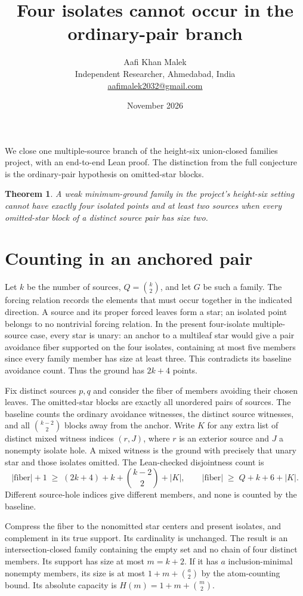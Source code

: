 \documentclass[11pt,letterpaper]{article}
\title{Four isolates cannot occur in the ordinary-pair branch}
\author{Aafi Khan Malek\\\small Independent Researcher, Ahmedabad, India\\
\small\href{mailto:aafimalek2032@gmail.com}{aafimalek2032@gmail.com}}
\date{November 2026}
\newtheorem{theorem}{Theorem}
\begin{document}
\maketitle
We close one multiple-source branch of the height-six
union-closed families project, with an end-to-end Lean proof.
The distinction from the full conjecture is the ordinary-pair
hypothesis on omitted-star blocks.

\begin{theorem}
A weak minimum-ground family in the project's height-six
setting cannot have exactly four isolated points and at least
two sources when every omitted-star block of a distinct
source pair has size two.
\end{theorem}

\section*{Counting in an anchored pair}
Let \(k\) be the number of sources, \(Q=\binom k2\), and let
\(G\) be such a family. The forcing relation records the
elements that must occur together in the indicated direction.
A source and its proper forced leaves form a star; an isolated
point belongs to no nontrivial forcing relation. In the
present four-isolate multiple-source case, every star is
unary: an anchor to a multileaf star would give a pair
avoidance fiber supported on the four isolates, containing
at most five members since every family member has size
at least three. This contradicts its baseline avoidance
count. Thus the ground has \(2k+4\) points.

Fix distinct sources \(p,q\) and consider the fiber of members
avoiding their chosen leaves. The omitted-star blocks are
exactly all unordered pairs of sources. The baseline counts
the ordinary avoidance witnesses, the distinct source
witnesses, and all \(\binom{k-2}{2}\) blocks away from the
anchor. Write \(K\) for any extra list of distinct mixed
witness indices \((r,J)\), where \(r\) is an exterior source and
\(J\) a nonempty isolate hole. A mixed witness is the ground
with precisely that unary star and those isolates omitted.
The Lean-checked disjointness count is
\[
 |\text{fiber}|+1\;\ge\; (2k+4)+k+\binom{k-2}{2}+|K|,
 \qquad
 |\text{fiber}|\;\ge\;Q+k+6+|K|.
\]
Different source-hole indices give different members, and none
is counted by the baseline.

Compress the fiber to the nonomitted star centers and present
isolates, and complement in its true support. Its cardinality
is unchanged. The result is an intersection-closed family
containing the empty set and no chain of four distinct members.
Its support has size at most \(m=k+2\). If it has \(a\)
inclusion-minimal nonempty members, its size is at most
\(1+m+\binom a2\) by the atom-counting bound. Its absolute
capacity is \(H(m)=1+m+\binom m2\).
\end{document}
